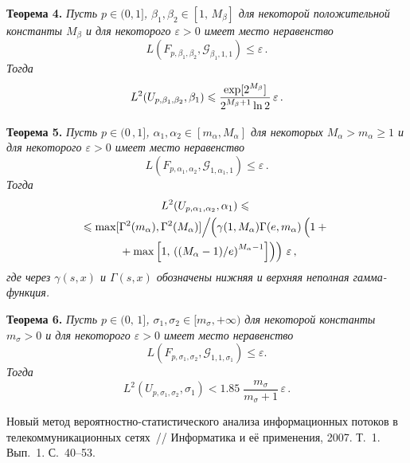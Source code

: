 \begin{multicols}{2}
\medskip

\noindent
\textbf{Теорема 4.}
\textit{Пусть $p\in(0,1]$, $\beta_1,\beta_2\in [1,\, M_{\beta}]$ для
некоторой положительной константы $M_{\beta}$ и для некоторого
$\varepsilon>0$ имеет место неравенство}
$$
L(F_{p,\beta_1,\beta_2}, {\mathcal G}_{\beta_1,1,1} ) \leqslant
\varepsilon\,.
$$
\textit{Тогда}
$$
L^2(U_{p,\beta_1,\beta_2},\beta_1) \leqslant
\displaystyle\frac{\displaystyle \exp[2^{M_{\beta}}]\mathstrut}{\displaystyle 2^{M_{\beta}+1} \ln2\mathstrut}\,\varepsilon\,.
$$

\smallskip

\noindent
\textbf{Теорема 5.}
\textit{
Пусть $p\in(0\,,1]$, $\alpha_1,\alpha_2 \in [m_{\alpha},
M_{\alpha}]$ для некоторых $M_{\alpha}>m_{\alpha}\geqslant1$ и для
некоторого $\varepsilon>0$ имеет место неравенство}
$$
L(F_{p,\alpha_1,\alpha_2}, {\mathcal G}_{1,\alpha_1,1} ) \leqslant
\varepsilon\,.
$$
\textit{Тогда}
\begin{multline*}
L^2(U_{p,\alpha_1,\alpha_2},\alpha_1) 
\leqslant{}\\
{}\leqslant
 \max
[\Gamma^2(m_{\alpha}),\Gamma^2(M_{\alpha})]\Big /\!\!
\left.\left(\gamma(1,M_{\alpha})\Gamma(e,m_{\alpha})
\left(\vphantom{\Gamma^2\Big /}
1+{}\right.\right.\right. %
\\
\left.\left.{}+\max\left[ 1,\,
\left((M_{\alpha}-1)/e\right)^{M_{\alpha}-1}\right]\right)\right)
\, \varepsilon\,,
\end{multline*}
\textit{где через $\gamma(s,x)$ и $\Gamma(s,x)$ обозначены нижняя и
верхняя неполная гам\-ма-функ\-ция.} 

\medskip

\noindent
\textbf{Теорема 6.}
\textit{Пусть $p\in(0,\,1]$, $\sigma_1,\sigma_2 \in [m_{\sigma},+\infty)$
для некоторой константы $m_{\sigma}>0$ и для некоторого
$\varepsilon>0$ имеет место неравенство}
$$
L(F_{p,\sigma_1,\sigma_2}, {\mathcal G}_{1,1,\sigma_1} ) \leqslant \varepsilon.
$$
\textit{Тогда}
$$
L^2(U_{p,\sigma_1,\sigma_2},\sigma_1) < 1.85 \; \frac{m_{\sigma}}{m_{\sigma}+1} \, \varepsilon\,.
$$

{\small\frenchspacing
{%
\begin{thebibliography}{99}

Новый метод ве\-ро\-ят\-но\-ст\-но-ста\-ти\-сти\-че\-ско\-го анализа информационных
потоков в телекоммуникационных сетях~// Информатика и её
применения, 2007. Т.~1. Вып.~1. С.~40--53.


\end{thebibliography}}}
\end{multicols}
